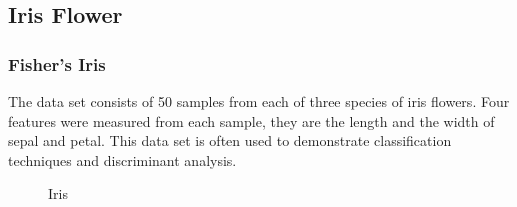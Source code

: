 \documentclass{beamer}
\begin{document}
\subsection{Iris Flower}
\begin{frame}
\frametitle{Fisher's Iris}
The data set consists of 50 samples from each of three 
species of iris flowers.  Four features were measured from each
sample, they are the length and the width of sepal and petal. This data set is often used
to demonstrate classification techniques and discriminant analysis.
\begin{figure}[htbp] \centering {}
\hspace{20pt} 
\hspace{20pt} 
\caption{Iris } \end{figure}
\end{frame}
\end{document}
